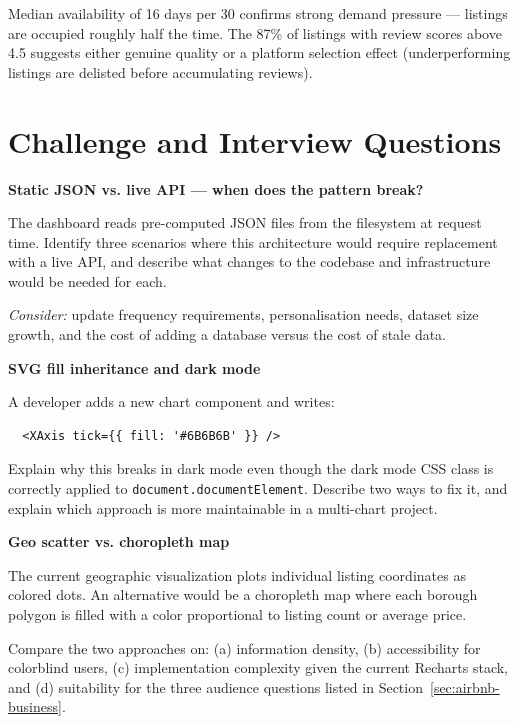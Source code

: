 Median availability of 16 days per 30 confirms strong demand pressure — listings
are occupied roughly half the time. The 87\% of listings with review scores above
4.5 suggests either genuine quality or a platform selection effect (underperforming
listings are delisted before accumulating reviews).

\section{Challenge and Interview Questions}
\label{sec:airbnb-questions}

\begin{challengebox}
  \textbf{Static JSON vs. live API — when does the pattern break?}

  The dashboard reads pre-computed JSON files from the filesystem at request time.
  Identify three scenarios where this architecture would require replacement with a
  live API, and describe what changes to the codebase and infrastructure would be
  needed for each.

  \medskip
  \textit{Consider:} update frequency requirements, personalisation needs, dataset
  size growth, and the cost of adding a database versus the cost of stale data.
\end{challengebox}

\begin{challengebox}
  \textbf{SVG fill inheritance and dark mode}

  A developer adds a new chart component and writes:
  \begin{verbatim}
  <XAxis tick={{ fill: '#6B6B6B' }} />
  \end{verbatim}
  Explain why this breaks in dark mode even though the dark mode CSS class is
  correctly applied to \texttt{document.documentElement}. Describe two ways to fix
  it, and explain which approach is more maintainable in a multi-chart project.
\end{challengebox}

\begin{challengebox}
  \textbf{Geo scatter vs. choropleth map}

  The current geographic visualization plots individual listing coordinates as
  colored dots. An alternative would be a choropleth map where each borough polygon
  is filled with a color proportional to listing count or average price.

  Compare the two approaches on: (a) information density, (b) accessibility for
  colorblind users, (c) implementation complexity given the current Recharts stack,
  and (d) suitability for the three audience questions listed in
  Section~\ref{sec:airbnb-business}.
\end{challengebox}

